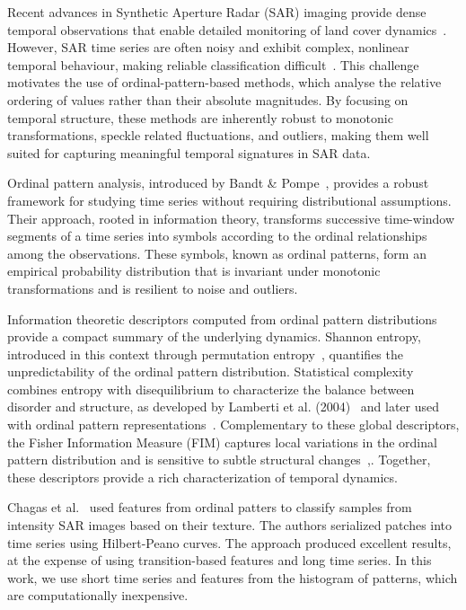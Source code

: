 Recent advances in Synthetic Aperture Radar (SAR) imaging provide dense temporal observations that enable detailed monitoring of land cover dynamics~\cite{Sabir2024}. However, SAR time series are often noisy
and exhibit complex, nonlinear temporal behaviour, making reliable classification difficult~\cite{Sabir2025}. This challenge motivates the use of ordinal-pattern-based methods, which analyse the relative ordering of values rather than their absolute magnitudes. By focusing on
temporal structure, these methods are inherently robust to monotonic transformations, speckle related fluctuations, and outliers, making them well suited for capturing meaningful temporal signatures in SAR data.

Ordinal pattern analysis, introduced by Bandt \& Pompe~\cite{PhysRevLett.88.174102}, provides a robust framework for studying time series without requiring distributional assumptions. Their approach, rooted in information
theory, transforms successive time-window segments of a time series into symbols according to the ordinal relationships among the observations. These symbols, known as ordinal patterns, form an empirical probability distribution that is invariant under monotonic transformations and is resilient to noise and outliers.

Information theoretic descriptors computed from ordinal pattern distributions provide a compact summary of the underlying dynamics. Shannon entropy, introduced in this context through permutation entropy~\cite{PhysRevLett.88.174102}, quantifies the unpredictability of the ordinal pattern distribution. Statistical complexity combines entropy with disequilibrium to characterize the balance between disorder and structure, as developed by Lamberti et al. (2004)~\cite{lamberti2004intensive} and later used with ordinal pattern representations~\cite{Rosso2010}. Complementary to these global descriptors, the Fisher Information Measure (FIM) captures local variations in the ordinal pattern distribution and is sensitive to subtle structural changes~\cite{Ferri2009},\cite{Olivares2012}.
Together, these descriptors provide a rich characterization of temporal dynamics.

Chagas et al.~\cite{Chagas2021} used features from ordinal patters to classify samples from intensity SAR images based on their texture. The authors serialized patches into time series using Hilbert-Peano curves. The approach produced excellent results, at the expense of using transition-based features and long time series. In this work, we use short time series and features from the histogram of patterns, which are computationally inexpensive.

